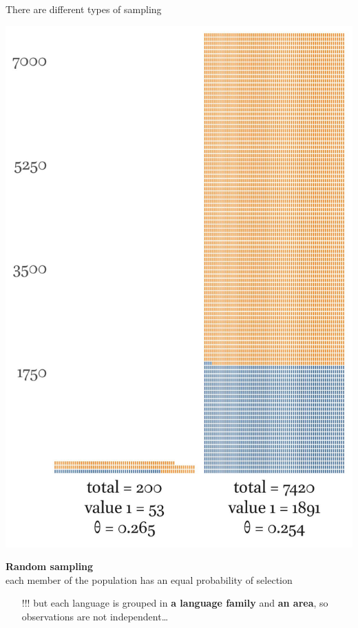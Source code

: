\documentclass[13pt, t]{beamer}
\begin{document}
\begin{frame}{There are different types of sampling}
\begin{multicols}{2}
\includegraphics[width=\linewidth]{images/03_simple_sample}
\columnbreak

\textbf{Random sampling}\\
each member of the population has an equal probability of selection \pause\\
\begin{itemize}
\item[\color{colorblue}!!!] but each language is grouped in \textbf{a language family} and \textbf{an area}, so observations are not independent\dots
\end{itemize}

\end{multicols}
\end{frame}
\end{document}
